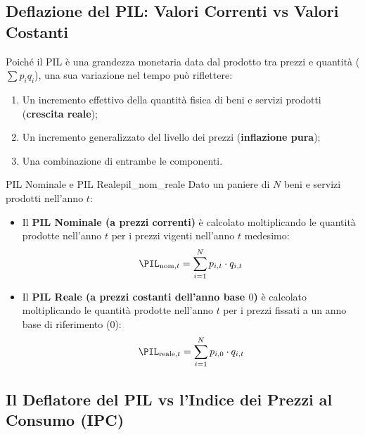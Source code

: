 \subsection{Deflazione del PIL: Valori Correnti vs Valori Costanti}
Poiché il PIL è una grandezza monetaria data dal prodotto tra prezzi e quantità ($\sum p_i q_i$), una sua variazione nel tempo può riflettere:
\begin{enumerate}
    \item Un incremento effettivo della quantità fisica di beni e servizi prodotti (\textbf{crescita reale});
    \item Un incremento generalizzato del livello dei prezzi (\textbf{inflazione pura});
    \item Una combinazione di entrambe le componenti.
\end{enumerate}

\begin{definizione}{PIL Nominale e PIL Reale}{pil_nom_reale}
Dato un paniere di $N$ beni e servizi prodotti nell'anno $t$:
\begin{itemize}
    \item Il \textbf{PIL Nominale (a prezzi correnti)} è calcolato moltiplicando le quantità prodotte nell'anno $t$ per i prezzi vigenti nell'anno $t$ medesimo:
    \begin{equation}
        \PIL_{\text{nom}, t} = \sum_{i=1}^N p_{i, t} \cdot q_{i, t}
    \end{equation}
    \item Il \textbf{PIL Reale (a prezzi costanti dell'anno base $0$)} è calcolato moltiplicando le quantità prodotte nell'anno $t$ per i prezzi fissati a un anno base di riferimento ($0$):
    \begin{equation}
        \PIL_{\text{reale}, t} = \sum_{i=1}^N p_{i, 0} \cdot q_{i, t}
    \end{equation}
\end{itemize}
\end{definizione}

\subsection{Il Deflatore del PIL vs l'Indice dei Prezzi al Consumo (IPC)}

